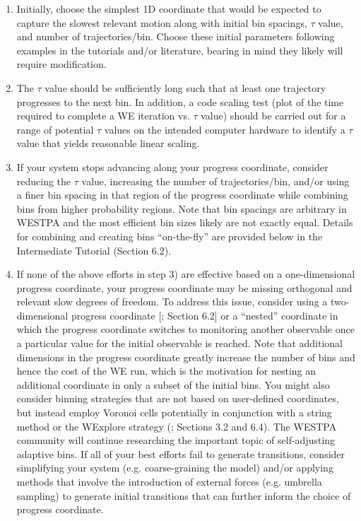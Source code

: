 \documentclass[9pt,tutorial,ASAPversion]{livecoms}
\begin{document}
\begin{enumerate}
\item Initially, choose the simplest 1D coordinate that would be expected to capture the slowest relevant motion along with initial bin spacings, $\tau$ value, and number of trajectories/bin. 
Choose these initial parameters following examples in the tutorials and/or literature, bearing in mind they likely will require modification.
\item The $\tau$ value should be sufficiently long such that at least one trajectory progresses to the next bin. 
In addition, a code scaling test (plot of the time required to complete a WE iteration vs. $\tau$ value) should be carried out for a range of potential $\tau$ values on the intended computer hardware to identify a $\tau$ value that yields reasonable linear scaling. 
\item If your system stops advancing along your progress coordinate, consider reducing the $\tau$ value, increasing the number of trajectories/bin, and/or using a finer bin spacing in that region of the progress coordinate while combining bins from higher probability regions. 
Note that bin spacings are arbitrary in WESTPA and the most efficient bin sizes likely are not exactly equal. 
Details for combining and creating bins “on-the-fly” are provided below in the Intermediate Tutorial (Section 6.2). 
\item If none of the above efforts in step 3) are effective based on a one-dimensional progress coordinate, your progress coordinate may be missing orthogonal and relevant slow degrees of freedom. 
To address this issue, consider using a two-dimensional progress coordinate [\citep{Saglam2019,Zwier2016}; Section 6.2] or a “nested” coordinate in which the progress coordinate switches to monitoring another observable once a particular value for the initial observable is reached. 
Note that additional dimensions in the progress coordinate greatly increase the number of bins and hence the cost of the WE run, which is the motivation for nesting an additional coordinate in only a subset of the initial bins. 
You might also consider binning strategies that are not based on user-defined coordinates, but instead employ Voronoi cells potentially in conjunction with a string method or the WExplore strategy (\citep{Dickson2014}; Sections 3.2 and 6.4). 
The WESTPA community will continue researching the important topic of self-adjusting adaptive bins. 
If all of your best efforts fail to generate transitions, consider simplifying your system (e.g. coarse-graining the model) and/or applying methods that involve the introduction of external forces (e.g. umbrella sampling) to generate initial transitions that can further inform the choice of progress coordinate.
\end{enumerate}
\end{document}
